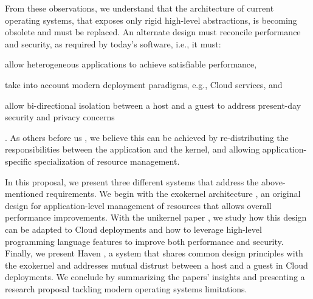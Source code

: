 From these observations, we understand that the architecture of current operating systems, that exposes only rigid high-level abstractions, is becoming obsolete and must be replaced.
An alternate design must reconcile performance and security, as required by today's software, i.e., it must:
\begin{enumerate*}
	\item allow heterogeneous applications to achieve satisfiable performance,
	\item take into account modern deployment paradigms, e.g., Cloud services, and 
	\item allow bi-directional isolation between a host and a guest to address present-day security and privacy concerns
\end{enumerate*}.
As others before us \cite{DBLP:conf/sosp/EnglerKO95,DBLP:conf/hotos/EnglerK95,DBLP:conf/sosp/KaashoekEGBHMPGM97,DBLP:journals/tocs/CaoFKL96,DBLP:journals/sigops/HartyC92}, we believe this can be achieved by re-distributing the responsibilities between the application and the kernel, and allowing application-specific specialization of resource management.

In this proposal, we present three different systems that address the above-mentioned requirements.
We begin with the exokernel architecture \cite{DBLP:conf/sosp/EnglerKO95}, an original design for application-level management of resources that allows overall performance improvements.
With the unikernel paper \cite{DBLP:conf/asplos/MadhavapeddyMRSSGSHC13}, we study how this design can be adapted to Cloud deployments and how to leverage high-level programming language features to improve both performance and security.
Finally, we present Haven \cite{DBLP:journals/tocs/BaumannPH15}, a system that shares common design principles with the exokernel and addresses mutual distrust between a host and a guest in Cloud deployments.
We conclude by summarizing the papers' insights and presenting a research proposal tackling modern operating systems limitations.








